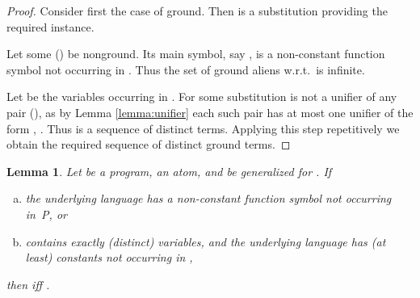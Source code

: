 \documentclass[a4paper]{tlp2}
\newtheorem{lemma}[theorem]{Lemma}
\begin{document}
\begin{proof}
Consider first the case of  ground.
Then 
is a substitution providing the required instance. 
{\sloppy\par}


Let some  () be nonground. 
Its main symbol, say , is a non-constant function symbol not
occurring in . Thus the set  of ground aliens w.r.t.\  is infinite.
\pagebreak[3]

Let  be the variables occurring in  .
For some  substitution  is not a unifier of any
pair  (),
as by  Lemma \ref{lemma:unifier} 
each such pair has at most one unifier of the form , .
Thus  is a sequence of  distinct terms.
Applying this step repetitively we obtain the required sequence
 of distinct ground terms.
\end{proof}





\begin{lemma}
\label{lemma:MP}
Let  be a program,
 an atom, and   be  generalized for .
If
\begin{enumerate}[(a)]
\item 
\label{lemma:MP:condition1}
the underlying language has a non-constant function symbol not occurring in~P,
or 

\item 
\label{lemma:MP:condition2}
 contains exactly  (distinct) variables, and
the underlying language has (at least)  constants not occurring in ,
\nopagebreak
\end{enumerate}
\nopagebreak
then  iff .
\end{lemma}
\end{document}
